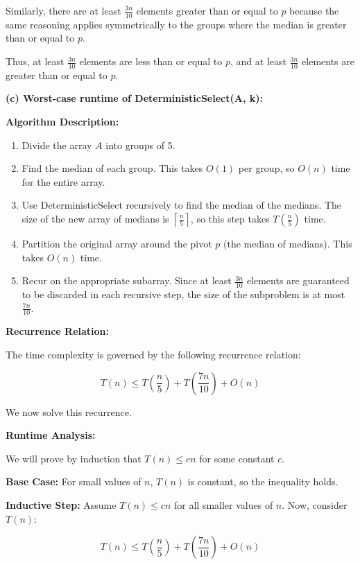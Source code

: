 \documentclass[11pt]{article}
\begin{document}
Similarly, there are at least $\frac{3n}{10}$ elements greater than or equal to $p$ because the same reasoning applies symmetrically to the groups where the median is greater than or equal to $p$.

Thus, at least $\frac{3n}{10}$ elements are less than or equal to $p$, and at least $\frac{3n}{10}$ elements are greater than or equal to $p$.

\newpage

\textbf{(c) Worst-case runtime of DeterministicSelect(A, k):}

\textbf{Algorithm Description:}

\begin{enumerate}
    \item Divide the array $A$ into groups of 5.
    \item Find the median of each group. This takes $O(1)$ per group, so $O(n)$ time for the entire array.
    \item Use DeterministicSelect recursively to find the median of the medians. The size of the new array of medians is $\left\lceil \frac{n}{5} \right\rceil$, so this step takes $T\left( \frac{n}{5} \right)$ time.
    \item Partition the original array around the pivot $p$ (the median of medians). This takes $O(n)$ time.
    \item Recur on the appropriate subarray. Since at least $\frac{3n}{10}$ elements are guaranteed to be discarded in each recursive step, the size of the subproblem is at most $\frac{7n}{10}$.
\end{enumerate}

\textbf{Recurrence Relation:}

The time complexity is governed by the following recurrence relation:

\[
T(n) \leq T\left( \frac{n}{5} \right) + T\left( \frac{7n}{10} \right) + O(n)
\]

We now solve this recurrence.

\textbf{Runtime Analysis:}

We will prove by induction that $T(n) \leq c n$ for some constant $c$.

\textbf{Base Case:} For small values of $n$, $T(n)$ is constant, so the inequality holds.

\textbf{Inductive Step:} Assume $T(n) \leq c n$ for all smaller values of $n$. Now, consider $T(n)$:

\[
T(n) \leq T\left( \frac{n}{5} \right) + T\left( \frac{7n}{10} \right) + O(n)
\]
\end{document}
